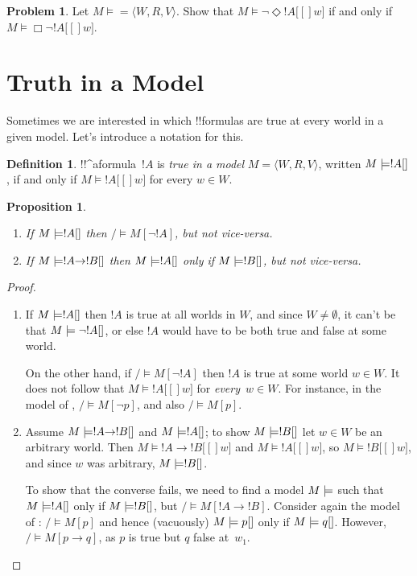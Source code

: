 \documentclass[10pt,a4paper]{article}
\makeatletter
\theoremstyle{plain}
\newtheorem{prop}[thm]{Proposition}
\theoremstyle{definition}
\newtheorem{defn}[thm]{Definition}
\newtheorem{prob}{Problem}[section]
\theoremstyle{remark}
\newenvironment{probtag}[1]{\begin{prob}}{\end{prob}}
\newcommand*{\olfileid}[3]{}
\newcommand*{\olsection}[1]{\section*{#1}}
\newcommand*{\ollabel}[1]{\label{#1}}
\newcommand{\olref}{\@ifnextchar[{\olref@i}{\olref@final}}
\def\olref@i[#1]{\@ifnextchar[{\olref@ii}{\olref@final}}
\def\olref@ii[#1]{\@ifnextchar[{\olref@iii}{\olref@final}}
\def\olref@iii[#1]{\olref@final}
\def\olref@final#1{\ref{#1}}
\providecommand{\lif}{\mathbin{\rightarrow}}
\providecommand{\mSat}[3]{\ensuremath{#1 \models #2[#3]}}
\providecommand{\mModel}[2]{\ensuremath{#1 \models #2}}
\providecommand{\tuple}[1]{\langle #1 \rangle}
\makeatother
\begin{document}
\begin{probtag}{prvDiamond}
  Let $\mModel{M} = \tuple{W, R, V}$. Show that
  $\mSat{M}{\lnot\Diamond !A}[w]$ if and only if
  $\mSat{M}{\Box\lnot!A}[w]$.
\end{probtag}





\olfileid{nml}{syn}{tru}

\olsection{Truth in a Model}

Sometimes we are interested in which !!{formula}s are true at every world
in a given model. Let's introduce a notation for this.

\begin{defn}
  !!^a{formula}~$!A$ is \emph{true in a model} $M = \tuple{W, R,
    V}$, written $\mSat{M}{!A}$, if and only if $\mSat{M}{!A}[w]$
  for every $w \in W$.
\end{defn}

\begin{prop}\ollabel{prop:truthfacts}
  \begin{enumerate}
  \item If $\mSat{M}{!A}$ then $\mSat/{M}{\lnot !A}$, but \emph{not}
    vice-versa.
  \item If $\mSat{M}{!A \lif !B}$ then $\mSat{M}{!A}$ only if
    $\mSat{M}{!B}$, but \emph{not} vice-versa.
  \end{enumerate}
\end{prop}

\begin{proof}
  \begin{enumerate}
  \item If $\mSat{M}{!A}$ then $!A$ is true at all worlds in $W$, and
    since $W \neq \emptyset$, it can't be that $\mSat{M}{\lnot!A}$, or
    else $!A$ would have to be both true and false at some
    world.

    On the other hand, if $\mSat/{M}{\lnot !A}$ then $!A$ is true at
    some world $w \in W$. It does not follow that $\mSat{M}{!A}[w]$
    for \emph{every}~$w \in W$. For instance, in the model of
    \olref[rel]{fig:simple}, $\mSat/{M}{\lnot p}$, and also $\mSat/{M}{p}$.
  \item Assume $\mSat{M}{!A \lif !B}$ and $\mSat{M}{!A}$; to show
    $\mSat{M}{!B}$ let $w \in W$ be an arbitrary world. Then
    $\mSat{M}{!A \lif !B}[w]$ and $\mSat{M}{!A}[w]$, so
    $\mSat{M}{!B}[w]$, and since $w$ was arbitrary,
    $\mSat{M}{!B}$.

    To show that the converse fails, we need to find a model
    $\mModel{M}$ such that $\mSat{M}{!A}$ only if $\mSat{M}{!B}$, but
    $\mSat/{M}{!A \lif !B}$. Consider again the model of
    \olref[rel]{fig:simple}: $\mSat/{M}{p}$ and hence (vacuously)
    $\mSat{M}{p}$ only if $\mSat{M}{q}$. However, $\mSat/{M}{p \lif
      q}$, as $p$ is true but $q$ false at~$w_1$.
  \end{enumerate}
\end{proof}
\end{document}
